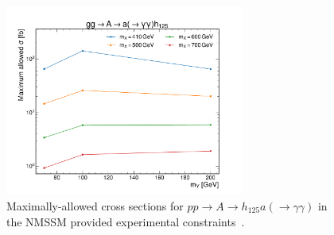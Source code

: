 \begin{figure}[h]
    \centering
    \includegraphics[width=0.7\textwidth]{Figures/Theory/SUSY/max_allowed_limits.pdf}
    \caption[Maximally-Allowed Cross Sections for $pp\rightarrow A \rightarrow H_{125}(\rightarrow\tau\tau)a(\rightarrow\gamma\gamma)$ in the NMSSM]{Maximally-allowed cross sections for $pp\rightarrow A \rightarrow h_{125}a(\rightarrow\gamma\gamma)$ in the NMSSM provided experimental constraints~\cite{Ellwanger:2022jtd}.}\label{fig:max_allowed_constraints}
\end{figure}